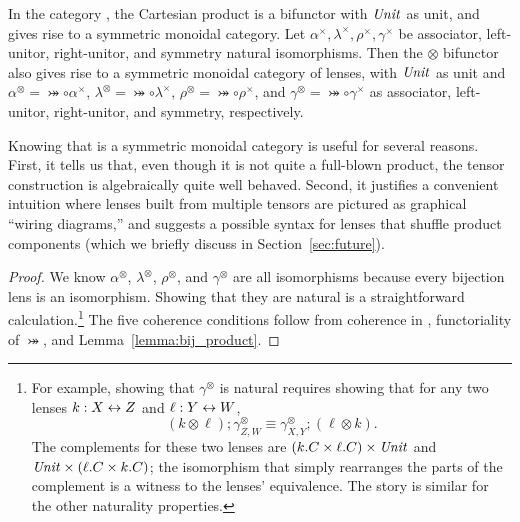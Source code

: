 \begin{defn}[$R$-similarity]
\begin{theorem}
\begin{lemma}
\begin{theorem}[No products]
\begin{prop}
In the category \SET, the Cartesian product is a bifunctor with $\mathit{Unit}$ as
unit, and gives rise to a symmetric monoidal category. Let
$\alpha^\times,\lambda^\times,\rho^\times,\gamma^\times$ be associator,
left-unitor, right-unitor, and symmetry natural isomorphisms. Then the
$\otimes$ bifunctor also gives rise to a symmetric monoidal category of
lenses, with $\mathit{Unit}$ as unit and $\alpha^\otimes=\bij\circ\alpha^\times$,
$\lambda^\otimes=\bij\circ\lambda^\times$,
$\rho^\otimes=\bij\circ\rho^\times$, and
$\gamma^\otimes=\bij\circ\gamma^\times$ as associator, left-unitor,
right-unitor, and symmetry, respectively.
\end{prop}

Knowing that \LENS{} is a symmetric monoidal category is useful for several
reasons.  First, it tells us that, even though it is not quite a full-blown
product, the tensor construction is algebraically quite well behaved.
Second, it justifies a convenient intuition where lenses built from multiple
tensors are pictured as graphical ``wiring diagrams,'' and suggests a
possible syntax for lenses that shuffle product components (which we briefly
discuss in Section~\ref{sec:future}).

\iflater{}\fi

\iffull
\begin{proof}
We know $\alpha^\otimes$, $\lambda^\otimes$, $\rho^\otimes$, and
$\gamma^\otimes$ are all isomorphisms because every bijection lens is an
isomorphism. Showing that they are natural is a straightforward
calculation.\footnote{For example, showing that $\gamma^\otimes$ is natural
requires showing that for any two lenses $k : X \leftrightarrow Z$ and $\ell : Y \leftrightarrow
W$,
\[(k \otimes \ell);\gamma^\otimes_{Z,W} \equiv \gamma^\otimes_{X,Y};(\ell
\otimes k).\]
The complements for these two lenses are $(k.C \times \ell.C) \times \mathit{Unit}$
and $\mathit{Unit} \times (\ell.C \times k.C)$; the isomorphism that simply
rearranges the parts of the complement is a witness to the lenses'
equivalence.  The story is similar for the other naturality properties.}
The five coherence conditions follow from coherence in \SET, functoriality of
$\bij$, and Lemma~\ref{lemma:bij_product}.
\end{proof}
\fi


\end{theorem}
\end{lemma}
\end{theorem}
\end{defn}
